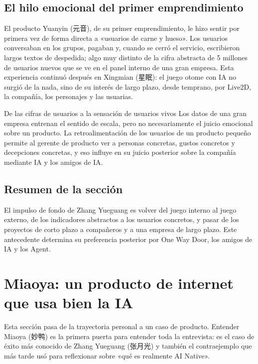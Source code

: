 \documentclass[a4paper]{article}
\begin{document}
\subsection{El hilo emocional del primer emprendimiento}

El producto Yuanyin (元音), de su primer emprendimiento, le hizo sentir por primera vez de forma directa a «usuarios de carne y hueso». Los usuarios conversaban en los grupos, pagaban y, cuando se cerró el servicio, escribieron largos textos de despedida; algo muy distinto de la cifra abstracta de 5 millones de usuarios nuevos que se ve en el panel interno de una gran empresa. Esta experiencia continuó después en Xingmian (星眠): el juego otome con IA no surgió de la nada, sino de su interés de largo plazo, desde temprano, por Live2D, la compañía, los personajes y las usuarias.

\begin{knowledgebox}{De las cifras de usuarios a la sensación de usuarios vivos}
Los datos de una gran empresa entrenan el sentido de escala, pero no necesariamente el juicio emocional sobre un producto. La retroalimentación de los usuarios de un producto pequeño permite al gerente de producto ver a personas concretas, gustos concretos y decepciones concretas, y eso influye en su juicio posterior sobre la compañía mediante IA y los amigos de IA.
\end{knowledgebox}

\subsection{Resumen de la sección}

El impulso de fondo de Zhang Yueguang es volver del juego interno al juego externo, de los indicadores abstractos a los usuarios concretos, y pasar de los proyectos de corto plazo a compañeros y a una empresa de largo plazo. Este antecedente determina su preferencia posterior por One Way Door, los amigos de IA y los Agent.
\section{Miaoya: un producto de internet que usa bien la IA}

Esta sección pasa de la trayectoria personal a un caso de producto. Entender Miaoya (妙鸭) es la primera puerta para entender toda la entrevista: es el caso de éxito más conocido de Zhang Yueguang (张月光) y también el contraejemplo que más tarde usó para reflexionar sobre «qué es realmente AI Native».
\end{document}
